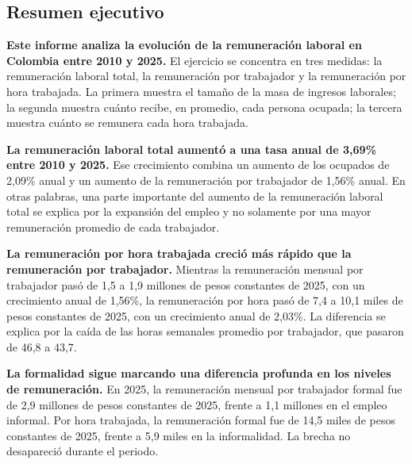 \documentclass[12pt, a4paper]{article}
\begin{document}
\begin{mdframed}[
  linewidth=1pt,
  linecolor=gray!60,
  backgroundcolor=gray!6,
  innertopmargin=12pt,
  innerbottommargin=12pt,
  innerleftmargin=14pt,
  innerrightmargin=14pt
]
\section*{Resumen ejecutivo}
\textbf{Este informe analiza la evolución de la remuneración laboral en Colombia entre 2010 y 2025.} El ejercicio se concentra en tres medidas: la remuneración laboral total, la remuneración por trabajador y la remuneración por hora trabajada. La primera muestra el tamaño de la masa de ingresos laborales; la segunda muestra cuánto recibe, en promedio, cada persona ocupada; la tercera muestra cuánto se remunera cada hora trabajada.

\textbf{La remuneración laboral total aumentó a una tasa anual de 3,69\% entre 2010 y 2025.} Ese crecimiento combina un aumento de los ocupados de 2,09\% anual y un aumento de la remuneración por trabajador de 1,56\% anual. En otras palabras, una parte importante del aumento de la remuneración laboral total se explica por la expansión del empleo y no solamente por una mayor remuneración promedio de cada trabajador.

\textbf{La remuneración por hora trabajada creció más rápido que la remuneración por trabajador.} Mientras la remuneración mensual por trabajador pasó de 1,5 a 1,9 millones de pesos constantes de 2025, con un crecimiento anual de 1,56\%, la remuneración por hora pasó de 7,4 a 10,1 miles de pesos constantes de 2025, con un crecimiento anual de 2,03\%. La diferencia se explica por la caída de las horas semanales promedio por trabajador, que pasaron de 46,8 a 43,7.

\textbf{La formalidad sigue marcando una diferencia profunda en los niveles de remuneración.} En 2025, la remuneración mensual por trabajador formal fue de 2,9 millones de pesos constantes de 2025, frente a 1,1 millones en el empleo informal. Por hora trabajada, la remuneración formal fue de 14,5 miles de pesos constantes de 2025, frente a 5,9 miles en la informalidad. La brecha no desapareció durante el periodo.
\end{mdframed}

\newpage
\tableofcontents
\newpage


\end{document}
